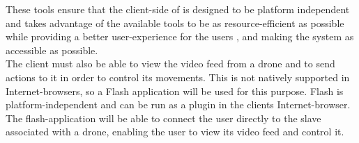 These tools ensure that the client-side of \projectname{} is designed to be platform independent and takes advantage of the available tools to be as resource-efficient as possible while providing a better user-experience for the users \citep{why_ajax_makes_the_user_experience_better}, and making the system as accessible as possible. \\

The client must also be able to view the video feed from a drone and to send actions to it in order to control its movements.
This is not natively supported in Internet-browsers, so a Flash application will be used for this purpose.
Flash is platform-independent and can be run as a plugin in the clients Internet-browser.
The flash-application will be able to connect the user directly to the slave associated with a drone, enabling the user to view its video feed and control it.

